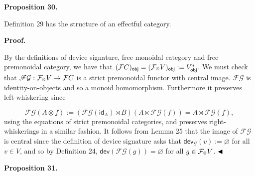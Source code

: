 \documentclass[10pt,a4paper]{article}
\begin{document}
 
 
\par\medskip\noindent\textbf{Proposition 30.}\par
 
 
Definition 29 has the structure of an effectful category.\par
 
 
 
 
 
\par\medskip\noindent\textbf{Proof.}\par
 
 
By the definitions of device signature, free monoidal category and free premonoidal category, we have that $(\mathcal{F}C)_{\mathsf{obj}}=(\mathcal{F}_{\mathbin{\raisebox{1.25pt}{$\scriptscriptstyle\otimes$}}}V)_{\mathsf{obj}}:=V_{\mathsf{obj}}^{*}$. We must check that $\mathscr{F}{\mathcal{G}}:\mathcal{F}_{\mathbin{\raisebox{1.25pt}{$\scriptscriptstyle\otimes$}}}V\to\mathcal{F}C$ is a strict premonoidal functor with central image. $\mathscr{F}{\mathcal{G}}$ is identity-on-objects and so a monoid homomorphism. Furthermore it preserves left-whiskering since\par
    \[\mathscr{F}{\mathcal{G}}(A\otimes f):=(\mathscr{F}{\mathcal{G}}(\mathsf{id}_{A})\rtimes B)(A\ltimes\mathscr{F}{\mathcal{G}}(f))=A\rtimes\mathscr{F}{\mathcal{G}}(f),\]    
using the equations of strict premonoidal categories, and preserves right-whiskerings in a similar fashion. It follows from Lemma 25 that the image of $\mathscr{F}{\mathcal{G}}$ is central since the definition of device signature asks that $\mathsf{dev}_{\mathcal{G}}(v):=\varnothing$ for all $v\in V$, and so by Definition 24, $\mathsf{dev}(\mathscr{F}{\mathcal{G}}(g))=\varnothing$ for all $g\in\mathcal{F}_{\mathbin{\raisebox{1.25pt}{$\scriptscriptstyle\otimes$}}}V$. $\hfill\blacktriangleleft$\par
 
 
 
\par\medskip\noindent\textbf{Proposition 31.}\par
 
\end{document}
